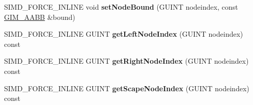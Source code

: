 \begin{DoxyCompactItemize}
\item 
\hypertarget{class_g_i_m___b_o_x___t_r_e_e_a910f36323977e36f0e911a09b47fe582}{S\+I\+M\+D\+\_\+\+F\+O\+R\+C\+E\+\_\+\+I\+N\+L\+I\+N\+E void {\bfseries set\+Node\+Bound} (G\+U\+I\+N\+T nodeindex, const \hyperlink{class_g_i_m___a_a_b_b}{G\+I\+M\+\_\+\+A\+A\+B\+B} \&bound)}\label{class_g_i_m___b_o_x___t_r_e_e_a910f36323977e36f0e911a09b47fe582}

\item 
\hypertarget{class_g_i_m___b_o_x___t_r_e_e_ae126d08b3f3ecf3a4e8263f663e3659c}{S\+I\+M\+D\+\_\+\+F\+O\+R\+C\+E\+\_\+\+I\+N\+L\+I\+N\+E G\+U\+I\+N\+T {\bfseries get\+Left\+Node\+Index} (G\+U\+I\+N\+T nodeindex) const }\label{class_g_i_m___b_o_x___t_r_e_e_ae126d08b3f3ecf3a4e8263f663e3659c}

\item 
\hypertarget{class_g_i_m___b_o_x___t_r_e_e_a71dd3e4f8634003d31b74dcee051d668}{S\+I\+M\+D\+\_\+\+F\+O\+R\+C\+E\+\_\+\+I\+N\+L\+I\+N\+E G\+U\+I\+N\+T {\bfseries get\+Right\+Node\+Index} (G\+U\+I\+N\+T nodeindex) const }\label{class_g_i_m___b_o_x___t_r_e_e_a71dd3e4f8634003d31b74dcee051d668}

\item 
\hypertarget{class_g_i_m___b_o_x___t_r_e_e_ac4a36fb6600fb0c549153627c883b262}{S\+I\+M\+D\+\_\+\+F\+O\+R\+C\+E\+\_\+\+I\+N\+L\+I\+N\+E G\+U\+I\+N\+T {\bfseries get\+Scape\+Node\+Index} (G\+U\+I\+N\+T nodeindex) const }\label{class_g_i_m___b_o_x___t_r_e_e_ac4a36fb6600fb0c549153627c883b262}

\end{DoxyCompactItemize}

